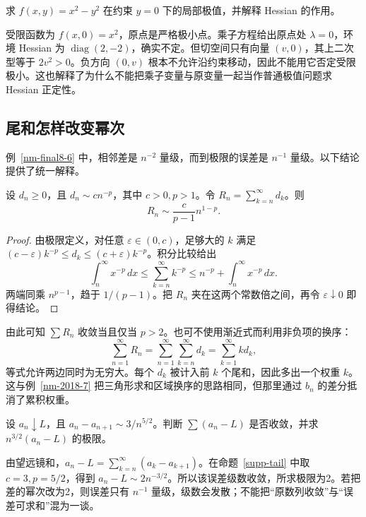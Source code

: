 \documentclass[UTF8,12pt,a4paper,fontset=fandol]{ctexart}
\begin{document}
\begin{example}
求 $f(x,y)=x^2-y^2$ 在约束 $y=0$ 下的局部极值，并解释 Hessian 的作用。
\end{example}
\begin{solve}
受限函数为 $f(x,0)=x^2$，原点是严格极小点。乘子方程给出原点处 $\lambda=0$，环境 Hessian 为 $\operatorname{diag}(2,-2)$，确实不定。但切空间只有向量 $(v,0)$，其上二次型等于 $2v^2>0$。负方向 $(0,v)$ 根本不允许沿约束移动，因此不能用它否定受限极小。这也解释了为什么不能把乘子变量与原变量一起当作普通极值问题求 Hessian 正定性。
\end{solve}

\subsection{尾和怎样改变幂次}
例~\ref{nm-final8-6} 中，相邻差是 $n^{-2}$ 量级，而到极限的误差是 $n^{-1}$ 量级。以下结论提供了统一解释。

\begin{proposition}[正项尾和渐近]\label{supp-tail}
设 $d_n\geq0$，且 $d_n\sim cn^{-p}$，其中 $c>0,p>1$。令 $R_n=\sum_{k=n}^\infty d_k$。则
\[
 R_n\sim\frac c{p-1}n^{1-p}.
\]
\end{proposition}
\begin{proof}
由极限定义，对任意 $\varepsilon\in(0,c)$，足够大的 $k$ 满足 $(c-\varepsilon)k^{-p}\leq d_k\leq(c+\varepsilon)k^{-p}$。积分比较给出
\[
 \int_n^\infty x^{-p}\,dx\leq\sum_{k=n}^\infty k^{-p}
 \leq n^{-p}+\int_n^\infty x^{-p}\,dx.
\]
两端同乘 $n^{p-1}$，趋于 $1/(p-1)$。把 $R_n$ 夹在这两个常数倍之间，再令 $\varepsilon\downarrow0$ 即得结论。
\end{proof}

由此可知 $\sum R_n$ 收敛当且仅当 $p>2$。也可不使用渐近式而利用非负项的换序：
\[
 \sum_{n=1}^\infty R_n
 =\sum_{n=1}^\infty\sum_{k=n}^\infty d_k
 =\sum_{k=1}^\infty k d_k,
\]
等式允许两边同时为无穷大。每个 $d_k$ 被计入前 $k$ 个尾和，因此多出一个权重 $k$。这与例~\ref{nm-2018-7} 把三角形求和区域换序的思路相同，但那里通过 $b_n$ 的差分抵消了累积权重。

\begin{example}
设 $a_n\downarrow L$，且 $a_n-a_{n+1}\sim3/n^{5/2}$。判断 $\sum(a_n-L)$ 是否收敛，并求 $n^{3/2}(a_n-L)$ 的极限。
\end{example}
\begin{solve}
由望远镜和，$a_n-L=\sum_{k=n}^\infty(a_k-a_{k+1})$。在命题~\ref{supp-tail} 中取 $c=3,p=5/2$，得到 $a_n-L\sim2n^{-3/2}$。所以该误差级数收敛，所求极限为2。若把差的幂次改为2，则误差只有 $n^{-1}$ 量级，级数会发散；不能把“原数列收敛”与“误差可求和”混为一谈。
\end{solve}
\end{document}
